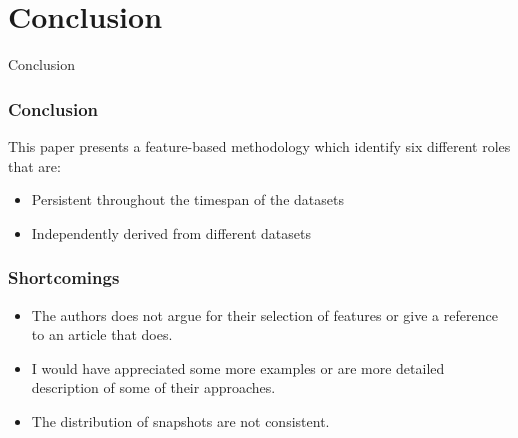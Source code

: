 \section{Conclusion}

\begin{frame}
\begin{center}
     	\huge Conclusion
     \end{center}
\end{frame}

\begin{frame}
\frametitle{Conclusion}
This paper presents a feature-based methodology which identify six different roles that are:
\begin{itemize}
	\item Persistent throughout the timespan of the datasets
	\item Independently derived from different datasets
\end{itemize}
\end{frame}

\begin{frame}
\frametitle{Shortcomings}
\begin{itemize}
\item The authors does not argue for their selection of features or give a reference to an article that does.
\item I would have appreciated some more examples or are more detailed description of some of their approaches.
\item The distribution of snapshots are not consistent.
\end{itemize}
\end{frame}
